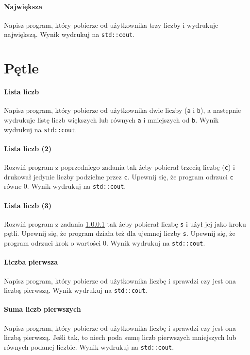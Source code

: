\documentclass[11pt,a4paper,titlepage,onecolumn]{article}
\begin{document}
\paragraph{Największa} Napisz program, który pobierze od
użytkownika trzy liczby i wydrukuje największą.
Wynik wydrukuj na \texttt{std::cout}.

\newpage
\section{Pętle}

\paragraph{Lista liczb}\label{ex_0001_list_of_numbers} Napisz program, który pobierze od użytkownika dwie
liczby (\texttt{a} i \texttt{b}), a następnie wydrukuje listę liczb większych
lub równych \texttt{a} i mniejszych od \texttt{b}.
Wynik wydrukuj na \texttt{std::cout}.

\paragraph{Lista liczb (2)} Rozwiń program z poprzedniego zadania tak żeby
pobierał trzecią liczbę (\texttt{c}) i drukował jedynie liczby podzielne przez
\texttt{c}. Upewnij się, że program odrzuci \texttt{c} równe 0.
Wynik wydrukuj na \texttt{std::cout}.

\paragraph{Lista liczb (3)} Rozwiń program z zadania \ref{ex_0001_list_of_numbers} tak żeby
pobierał liczbę \texttt{s} i użył jej jako kroku pętli. Upewnij się, że program
działa też dla ujemnej liczby \texttt{s}. Upewnij się, że program odrzuci krok o
wartości 0.
Wynik wydrukuj na \texttt{std::cout}.

\paragraph{Liczba pierwsza} Napisz program, który pobierze od użytkownika liczbę
i sprawdzi czy jest ona liczbą pierwszą.
Wynik wydrukuj na \texttt{std::cout}.

\paragraph{Suma liczb pierwszych} Napisz program, który pobierze od użytkownika liczbę
i sprawdzi czy jest ona liczbą pierwszą. Jeśli tak, to niech poda sumę liczb
pierwszych mniejszych lub równych podanej liczbie.
Wynik wydrukuj na \texttt{std::cout}.
\end{document}
